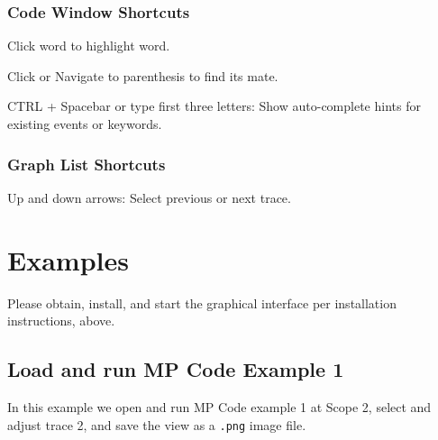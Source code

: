 \documentclass[11pt,fleqn]{article} %
\begin{document}
\subsubsection{Code Window Shortcuts}
\begin{compactitem}
\item Click word to highlight word.
\item Click or Navigate to parenthesis to find its mate.
\item CTRL + Spacebar or type first three letters: Show auto-complete hints for existing events or keywords.
\end{compactitem}

\subsubsection{Graph List Shortcuts}
\begin{compactitem}
\item Up and down arrows: Select previous or next trace.
\end{compactitem}

\section{Examples}
Please obtain, install, and start the \ggui graphical interface per installation instructions, above.
\subsection{Load and run MP Code Example 1}
In this example we open and run MP Code example 1 at Scope 2, select and adjust trace 2, and save the view as a \verb+.png+ image file.
\end{document}
